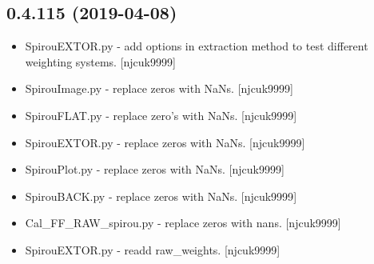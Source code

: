\documentclass[a4paper,10pt,english]{report}
\begin{document}
\subsection{0.4.115 (2019-04-08)}
\label{\detokenize{misc/changelog:id144}}\begin{itemize}
\item {} 
SpirouEXTOR.py - add options in extraction method to test different
weighting systems. {[}njcuk9999{]}

\item {} 
SpirouImage.py - replace zeros with NaNs. {[}njcuk9999{]}

\item {} 
SpirouFLAT.py - replace zero’s with NaNs. {[}njcuk9999{]}

\item {} 
SpirouEXTOR.py - replace zeros with NaNs. {[}njcuk9999{]}

\item {} 
SpirouPlot.py - replace zeros with NaNs. {[}njcuk9999{]}

\item {} 
SpirouBACK.py - replace zeros with NaNs. {[}njcuk9999{]}

\item {} 
Cal\_FF\_RAW\_spirou.py - replace zeros with nans. {[}njcuk9999{]}

\item {} 
SpirouEXTOR.py - readd raw\_weights. {[}njcuk9999{]}

\end{itemize}
\end{document}
